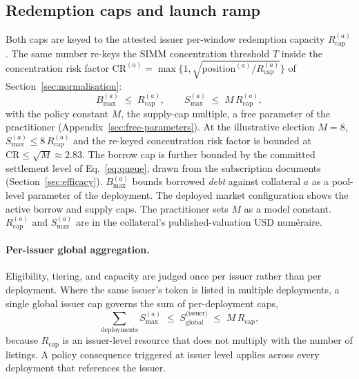 \subsection{Redemption caps and launch ramp}\label{sec:policy-caps}
Both caps are keyed to the attested issuer per-window redemption capacity $R_{\mathrm{cap}}^{(a)}$. The same number re-keys the SIMM concentration threshold $T$ inside the concentration risk factor $\mathrm{CR}^{(a)} = \max\{1, \sqrt{\mathrm{position}^{(a)}/R_{\mathrm{cap}}^{(a)}}\}$ of Section~\ref{sec:normalisation}:
\begin{equation}\label{eq:policy-caps}
B_{\max}^{(a)} \;\le\; R_{\mathrm{cap}}^{(a)},
\qquad
S_{\max}^{(a)} \;\le\; M\, R_{\mathrm{cap}}^{(a)},
\end{equation}
with the policy constant $M$, the supply-cap multiple, a free parameter of the practitioner (Appendix~\ref{sec:free-parameters}). At the illustrative election $M=8$, $S_{\max}^{(a)} \le 8\,R_{\mathrm{cap}}^{(a)}$ and the re-keyed concentration risk factor is bounded at $\mathrm{CR} \le \sqrt{M} \approx 2.83$. The borrow cap is further bounded by the committed settlement level of Eq.~\eqref{eq:queue}, drawn from the subscription documents (Section~\ref{sec:efficacy}). $B_{\max}^{(a)}$ bounds borrowed \emph{debt} against collateral $a$ as a pool-level parameter of the deployment. The deployed market configuration shows the active borrow and supply caps. The practitioner sets $M$ as a model constant. $R_{\mathrm{cap}}^{(a)}$ and $S_{\max}^{(a)}$ are in the collateral's published-valuation USD numéraire.

\paragraph{Per-issuer global aggregation.}\label{sec:policy-issuer}
Eligibility, tiering, and capacity are judged once per issuer rather than per deployment. Where the same issuer's token is listed in multiple deployments, a single global issuer cap governs the sum of per-deployment caps,
\begin{equation}\label{eq:issuer-global-cap}
\sum_{\text{deployments}} S_{\max}^{(a)} \;\le\; S_{\mathrm{global}}^{\text{(issuer)}} \;\le\; M \, R_{\mathrm{cap}},
\end{equation}
because $R_{\mathrm{cap}}$ is an issuer-level resource that does not multiply with the number of listings. A policy consequence triggered at issuer level applies across every deployment that references the issuer.

